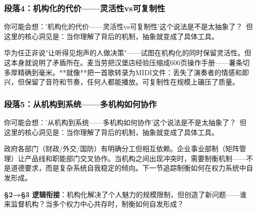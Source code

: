 \documentclass[a4paper,12pt]{book}
\newenvironment{motivation}{\begin{tcolorbox}[colback=gray!10,colframe=gray!60,title=\textit{本章动机 (Motivation)},fonttitle=\bfseries,arc=0mm,leftrule=3mm]\small\itshape}{\end{tcolorbox}}
\begin{document}
\begin{motivation}
\begin{motivation}
\begin{motivation}
	\subsubsection*{段落4：机构化的代价——灵活性vs可复制性}

	\begin{tcolorbox}[colback=yellow!5, title=\textit{读者行为预测}]
		你可能会想：'机构化的代价——灵活性vs可复制性'这个说法是不是太抽象了？\ 但这里的核心洞见是：当你理解了背后的机制，抽象就变成了具体工具。
	\end{tcolorbox}

华为任正非说"让听得见炮声的人做决策"——试图在机构化的同时保留灵活性。但这本身就说明了矛盾所在。麦当劳把汉堡店经验压缩成600页操作手册——薯条切多厚精确到毫米。**就像**把一首歌转录为MIDI文件：丢失了演奏者的情感和即兴，但保留了音符和节奏，任何人都能播放。可复制性在规模上碾压了质量。

	\subsubsection*{段落5：从机构到系统——多机构如何协作}

	\begin{tcolorbox}[colback=yellow!5, title=\textit{读者行为预测}]
		你可能会想：'从机构到系统——多机构如何协作'这个说法是不是太抽象了？\ 但这里的核心洞见是：当你理解了背后的机制，抽象就变成了具体工具。
	\end{tcolorbox}

政府各部门（财政/外交/国防）有明确分工但相互依赖。企业事业部制（矩阵管理）让产品线和职能部门交叉协作。当机构之间出现冲突时，需要制衡机制——不是道德要求，而是复杂系统自我稳定的倾向。下一节追踪制衡如何在权力系统中自发形成。

	\textbf{§2→§3 逻辑衔接}：机构化解决了个人魅力的规模限制，但创造了新问题——谁来监督机构？当多个权力中心共存时，制衡如何自发形成？

	

\end{motivation}
\end{motivation}
\end{motivation}
\end{document}

